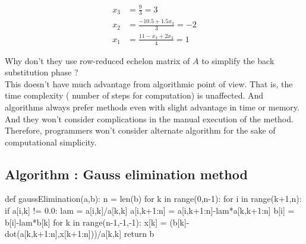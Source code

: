 	\begin{align*} x_3 & = \frac{9}{3} = 3 \\  x_2 & = \frac{-10.5 + 1.5x_3}{3} = -2 \\ x_1 & = \frac{11-x_3+2x_2}{4}=1 \end{align*}

\begin{remark}
\begin{commentary}
		Why don't they use row-reduced echelon matrix of $A$ to simplify the back substitution phase ?\\

		This doesn't have much advantage from algorithmic point of view. That is, the time complexity ( number of steps for computation) is unaffected. And algorithms always prefer methods even with slight advantage in time or memory. And they won't consider complications in the manual execution of the method. Therefore, programmers won't consider alternate algorithm for the sake of computational simplicity.
\end{commentary}
\end{remark}

\subsection{Algorithm : Gauss elimination method}
\begin{program}
	\begin{python}
	def gaussElimination(a,b):
		n = len(b)
		for k in range(0,n-1):
			for i in range(k+1,n):
				if a[i,k] != 0.0:
					lam = a[i,k]/a[k,k]
					a[i,k+1:n] = a[i,k+1:n]-lam*a[k,k+1:n]
					b[i] = b[i]-lam*b[k]
		for k in range(n-1,-1,-1):
			x[k] = (b[k]-dot(a[k,k+1:n],x[k+1:n]))/a[k,k]
		return b
	\end{python}
\end{program}

